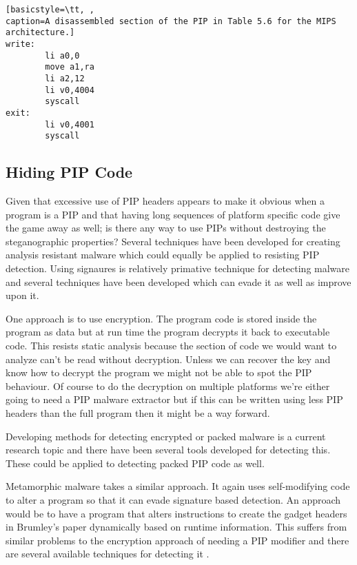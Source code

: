 \documentclass[10pt,]{book}
\begin{document}
\begin{lstlisting}[basicstyle=\tt, ,
caption=A disassembled section of the PIP in Table 5.6 for the MIPS architecture.]
write:
        li a0,0
        move a1,ra
        li a2,12
        li v0,4004
        syscall
exit:
        li v0,4001
        syscall
\end{lstlisting}
\subsection{Hiding PIP Code}

Given that excessive use of PIP headers appears to make it obvious when
a program is a PIP and that having long sequences of platform specific
code give the game away as well; is there any way to use PIPs without
destroying the steganographic properties? Several techniques have been
developed for creating analysis resistant
malware\autocite{Bethencourt:2008ug} which could equally be applied to
resisting PIP detection. Using signaures is relatively primative
technique for detecting malware\autocite{Zhang:2007jy} and several
techniques have been developed which can evade it as well as improve
upon it.

One approach is to use encryption. The program code is stored inside the
program as data but at run time the program decrypts it back to
executable code\autocite{Royal:2006ug}. This resists static analysis
because the section of code we would want to analyze can't be read
without decryption. Unless we can recover the key and know how to
decrypt the program we might not be able to spot the PIP behaviour. Of
course to do the decryption on multiple platforms we're either going to
need a PIP malware extractor but if this can be written using less PIP
headers than the full program then it might be a way forward.

Developing methods for detecting encrypted or packed malware is a
current research topic and there have been several tools developed for
detecting this\autocite{Chouchane:2006cf}\autocite{Zhang:2007jy}. These
could be applied to detecting packed PIP code as well.

Metamorphic malware\autocite{Sikorski:2011ua} takes a similar approach.
It again uses self-modifying code to alter a program so that it can
evade signature based detection. An approach would be to have a program
that alters instructions to create the gadget headers in Brumley's
paper\autocite{Cha:2010uh} dynamically based on runtime information.
This suffers from similar problems to the encryption approach of needing
a PIP modifier and there are several available techniques for detecting
it \autocite{Han:2011iu}\autocite{Ali:2011do}.
\end{document}
